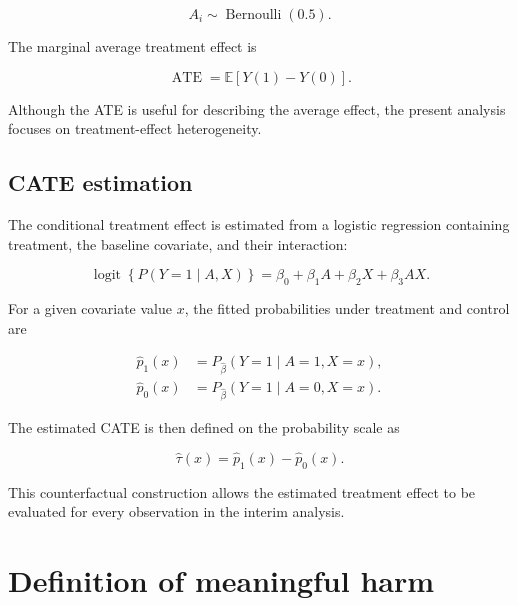\documentclass[11pt,a4paper]{article}
\newcommand{\ATE}{\operatorname{ATE}}
\begin{document}
\begin{equation}
A_i\sim\operatorname{Bernoulli}(0.5).
\end{equation}

The marginal average treatment effect is

\begin{equation}
\ATE
=
\mathbb{E}[Y(1)-Y(0)].
\end{equation}

Although the ATE is useful for describing the average effect, the present
analysis focuses on treatment-effect heterogeneity.

\subsection{CATE estimation}

The conditional treatment effect is estimated from a logistic regression
containing treatment, the baseline covariate, and their interaction:

\begin{equation}
\operatorname{logit}
\left\{
P(Y=1\mid A,X)
\right\}
=
\beta_0
+
\beta_1 A
+
\beta_2 X
+
\beta_3 AX.
\end{equation}

For a given covariate value $x$, the fitted probabilities under treatment and
control are

\begin{align}
\widehat p_1(x)
&=
P_{\widehat{\beta}}(Y=1\mid A=1,X=x),\\
\widehat p_0(x)
&=
P_{\widehat{\beta}}(Y=1\mid A=0,X=x).
\end{align}

The estimated CATE is then defined on the probability scale as

\begin{equation}
\widehat{\tau}(x)
=
\widehat p_1(x)-\widehat p_0(x).
\end{equation}

This counterfactual construction allows the estimated treatment effect to be
evaluated for every observation in the interim analysis.


\section{Definition of meaningful harm}
\end{document}
